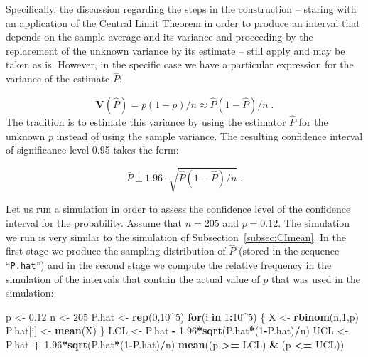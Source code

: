 \documentclass[]{krantz}
\makeatletter
\newenvironment{Shaded}{\begin{snugshade}}{\end{snugshade}}
\newcommand{\ControlFlowTok}[1]{\textcolor[rgb]{0.13,0.29,0.53}{\textbf{#1}}}
\newcommand{\DecValTok}[1]{\textcolor[rgb]{0.00,0.00,0.81}{#1}}
\newcommand{\FloatTok}[1]{\textcolor[rgb]{0.00,0.00,0.81}{#1}}
\newcommand{\KeywordTok}[1]{\textcolor[rgb]{0.13,0.29,0.53}{\textbf{#1}}}
\newcommand{\NormalTok}[1]{#1}
\newcommand{\OperatorTok}[1]{\textcolor[rgb]{0.81,0.36,0.00}{\textbf{#1}}}
\newcommand{\StringTok}[1]{\textcolor[rgb]{0.31,0.60,0.02}{#1}}
\newcommand{\Var}{\mathbf{V}}
\newenvironment{kframe}{%
\medskip{}
\setlength{\fboxsep}{.8em}
 \def\at@end@of@kframe{}%
 \ifinner\ifhmode%
  \def\at@end@of@kframe{\end{minipage}}%
  \begin{minipage}{\columnwidth}%
 \fi\fi%
 \def\FrameCommand##1{\hskip\@totalleftmargin \hskip-\fboxsep
 \colorbox{shadecolor}{##1}\hskip-\fboxsep
     \hskip-\linewidth \hskip-\@totalleftmargin \hskip\columnwidth}%
 \MakeFramed {\advance\hsize-\width
   \@totalleftmargin\z@ \linewidth\hsize
   \@setminipage}}%
 {\par\unskip\endMakeFramed%
 \at@end@of@kframe}
\renewenvironment{Shaded}{\begin{kframe}}{\end{kframe}}
\theoremstyle{definition}
\theoremstyle{definition}
\theoremstyle{definition}
\theoremstyle{remark}
\makeatother
\begin{document}
Specifically, the discussion regarding the steps in the construction --
staring with an application of the Central Limit Theorem in order to
produce an interval that depends on the sample average and its variance
and proceeding by the replacement of the unknown variance by its
estimate -- still apply and may be taken as is. However, in the specific
case we have a particular expression for the variance of the estimate
\(\hat P\):

\[\Var(\hat P) = p(1-p)/n \approx \hat P(1- \hat P) /n\;.\]
The tradition is to estimate this variance by using the estimator
\(\hat P\) for the unknown \(p\) instead of using the sample variance. The
resulting confidence interval of significance level 0.95 takes the form:

\[\bar P \pm 1.96 \cdot\sqrt{ \hat P(1-\hat P)/n}\;.\]

Let us run a simulation in order to assess the confidence level of the
confidence interval for the probability. Assume that \(n=205\) and
\(p=0.12\). The simulation we run is very similar to the simulation of
Subsection~\ref{subsec:CImean}. In the first stage we produce the
sampling distribution of \(\hat P\) (stored in the sequence ``\texttt{P.hat}'') and
in the second stage we compute the relative frequency in the simulation
of the intervals that contain the actual value of \(p\) that was used in
the simulation:

\begin{Shaded}
\begin{Highlighting}[]
\NormalTok{p <-}\StringTok{ }\FloatTok{0.12}
\NormalTok{n <-}\StringTok{ }\DecValTok{205}
\NormalTok{P.hat <-}\StringTok{ }\KeywordTok{rep}\NormalTok{(}\DecValTok{0}\NormalTok{,}\DecValTok{10}\OperatorTok{^}\DecValTok{5}\NormalTok{)}
\ControlFlowTok{for}\NormalTok{(i }\ControlFlowTok{in} \DecValTok{1}\OperatorTok{:}\DecValTok{10}\OperatorTok{^}\DecValTok{5}\NormalTok{) \{}
\NormalTok{  X <-}\StringTok{ }\KeywordTok{rbinom}\NormalTok{(n,}\DecValTok{1}\NormalTok{,p)}
\NormalTok{  P.hat[i] <-}\StringTok{ }\KeywordTok{mean}\NormalTok{(X)}
\NormalTok{\}}
\NormalTok{LCL <-}\StringTok{ }\NormalTok{P.hat }\OperatorTok{-}\StringTok{ }\FloatTok{1.96}\OperatorTok{*}\KeywordTok{sqrt}\NormalTok{(P.hat}\OperatorTok{*}\NormalTok{(}\DecValTok{1}\OperatorTok{-}\NormalTok{P.hat)}\OperatorTok{/}\NormalTok{n)}
\NormalTok{UCL <-}\StringTok{ }\NormalTok{P.hat }\OperatorTok{+}\StringTok{ }\FloatTok{1.96}\OperatorTok{*}\KeywordTok{sqrt}\NormalTok{(P.hat}\OperatorTok{*}\NormalTok{(}\DecValTok{1}\OperatorTok{-}\NormalTok{P.hat)}\OperatorTok{/}\NormalTok{n)}
\KeywordTok{mean}\NormalTok{((p }\OperatorTok{>=}\StringTok{ }\NormalTok{LCL) }\OperatorTok{&}\StringTok{ }\NormalTok{(p }\OperatorTok{<=}\StringTok{ }\NormalTok{UCL))}
\end{Highlighting}
\end{Shaded}
\end{document}
